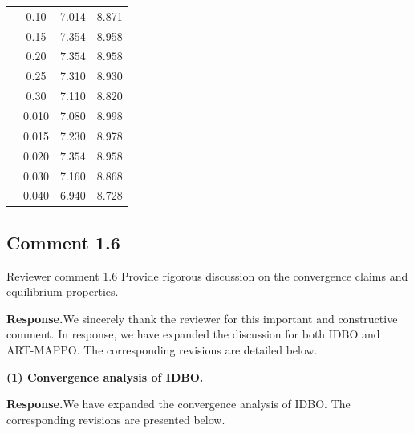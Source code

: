 \documentclass[11pt]{article}
\newcommand{\rsp}{\medskip\noindent\textbf{Response.}\quad}
\begin{document}
\begin{tcolorbox}[enhanced,breakable,colback=white,colframe=addblue!55,
coltext=addblue,fontupper=\color{addblue},boxrule=0.6pt,arc=2pt,
left=9pt,right=9pt,top=7pt,bottom=7pt]
{{\begin{tabular}{@{}lccc@{}}
& 0.10            & 7.014            & 8.871 \\
& 0.15            & 7.354            & 8.958 \\
& $\mathbf{0.20}$ & $\mathbf{7.354}$ & $\mathbf{8.958}$ \\
& 0.25            & 7.310            & 8.930 \\
& 0.30            & 7.110            & 8.820 \\
\midrule

& 0.010            & 7.080            & 8.998 \\
& 0.015            & 7.230            & 8.978 \\
& $\mathbf{0.020}$ & $\mathbf{7.354}$ & $\mathbf{8.958}$ \\
& 0.030            & 7.160            & 8.868 \\
& 0.040            & 6.940            & 8.728 \\
\hline
\end{tabular}
}
\par}
\end{tcolorbox}






\subsection*{Comment 1.6 }

\begin{reviewercomment}{Reviewer comment 1.6}
Provide rigorous discussion on the convergence claims and equilibrium properties.
\end{reviewercomment}

\rsp We sincerely thank the reviewer for this important and constructive
comment. In response, we have expanded the discussion for both
IDBO and ART-MAPPO. The corresponding revisions are detailed below.


\medskip
\noindent\textbf{(1) Convergence analysis of IDBO.}

\rsp We have expanded the convergence analysis of IDBO. The corresponding revisions are presented below.
\end{document}
